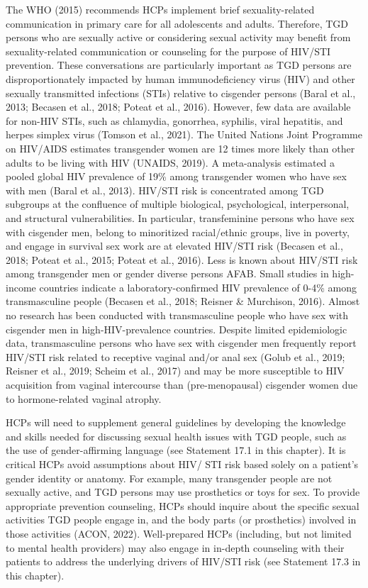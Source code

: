 \documentclass[
]{book}
\begin{document}
The WHO (2015) recommends HCPs implement brief sexuality-related communication in
primary care for all adolescents and adults.
Therefore, TGD persons who are sexually active
or considering sexual activity may benefit from
sexuality-related communication or counseling
for the purpose of HIV/STI prevention. These
conversations are particularly important as TGD
persons are disproportionately impacted by
human immunodeficiency virus (HIV) and other
sexually transmitted infections (STIs) relative to
cisgender persons (Baral et al., 2013; Becasen
et al., 2018; Poteat et al., 2016). However, few
data are available for non-HIV STIs, such as chlamydia, gonorrhea, syphilis, viral hepatitis, and
herpes simplex virus (Tomson et al., 2021). The
United Nations Joint Programme on HIV/AIDS
estimates transgender women are 12 times more
likely than other adults to be living with HIV
(UNAIDS, 2019). A meta-analysis estimated a
pooled global HIV prevalence of 19\% among
transgender women who have sex with men
(Baral et al., 2013). HIV/STI risk is concentrated
among TGD subgroups at the confluence of multiple biological, psychological, interpersonal, and
structural vulnerabilities. In particular, transfeminine persons who have sex with cisgender men,
belong to minoritized racial/ethnic groups, live
in poverty, and engage in survival sex work are
at elevated HIV/STI risk (Becasen et al., 2018;
Poteat et al., 2015; Poteat et al., 2016). Less is
known about HIV/STI risk among transgender
men or gender diverse persons AFAB. Small studies in high-income countries indicate a
laboratory-confirmed HIV prevalence of 0-4\%
among transmasculine people (Becasen et al.,
2018; Reisner \& Murchison, 2016). Almost no
research has been conducted with transmasculine
people who have sex with cisgender men in
high-HIV-prevalence countries. Despite limited
epidemiologic data, transmasculine persons who
have sex with cisgender men frequently report
HIV/STI risk related to receptive vaginal and/or
anal sex (Golub et al., 2019; Reisner et al., 2019;
Scheim et al., 2017) and may be more susceptible
to HIV acquisition from vaginal intercourse than
(pre-menopausal) cisgender women due to
hormone-related vaginal atrophy.

HCPs will need to supplement general guidelines by developing the knowledge and skills
needed for discussing sexual health issues with
TGD people, such as the use of gender-affirming
language (see Statement 17.1 in this chapter). It
is critical HCPs avoid assumptions about HIV/
STI risk based solely on a patient's gender identity or anatomy. For example, many transgender
people are not sexually active, and TGD persons
may use prosthetics or toys for sex. To provide
appropriate prevention counseling, HCPs should
inquire about the specific sexual activities TGD
people engage in, and the body parts (or prosthetics) involved in those activities (ACON,
2022). Well-prepared HCPs (including, but not
limited to mental health providers) may also
engage in in-depth counseling with their patients
to address the underlying drivers of HIV/STI risk
(see Statement 17.3 in this chapter).
\end{document}
